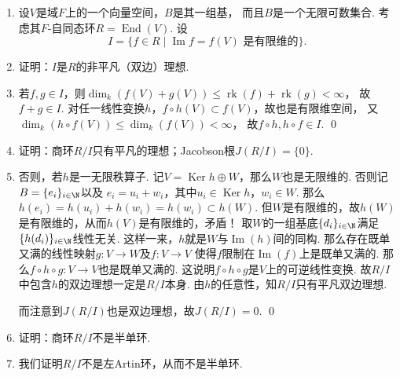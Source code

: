 \begin{enumerate}
        \item[8.5] 设$V$是域$F$上的一个向量空间，$B$是其一组基，
        而且$B$是一个无限可数集合. 考虑其$F$-自同态环$R = \operatorname{End}(V)$.
        设
        \[I = \{f \in R \mid \operatorname{Im} f = f(V)\text{ 是有限维的}\}.\]
        \item[(i)] 证明：$I$是$R$的非平凡（双边）理想.
        \item[\textbf{证明:}]
            若$f,g \in I$，则$\dim_{k}(f(V) + g(V)) 
            \leq \operatorname{rk}(f) + \operatorname{rk}(g) < \infty$，
            故$f+g \in I$.
            对任一线性变换$h$，$f \circ h(V) \subset f(V)$，故也是有限维空间，
            又$\dim_{k}(h \circ f(V)) \leq \dim_{k}(f(V)) < \infty$，
            故$f\circ h,h\circ f\in I$. \qed
        \item[(ii)] 证明：商环$R/I$只有平凡的理想；Jacobson根$J(R/I) = \{0\}$.
        \item[\textbf{证明:}]
            否则，若$h$是一无限秩算子.
            记$V = \operatorname{Ker} h \oplus W$，那么$W$也是无限维的.
            否则记$B = \{e_{i}\}_{i \in \N}$以及
            $e_{i} = u_{i} + w_{i}$，其中$u_{i} \in \operatorname{Ker} h$，$w_{i} \in W$.
            那么$h(e_{i}) = h(u_{i}) + h(w_{i}) = h(w_{i}) \subset h(W)$.
            但$W$是有限维的，故$h(W)$是有限维的，从而$h(V)$是有限维的，矛盾！            
            取$W$的一组基底$\{d_{i}\}_{i \in \N}$满足$\{h(d_{i})\}_{i \in \N}$线性无关. 
            这样一来，$h$就是$W$与$\operatorname{Im}(h)$间的同构.
            那么存在既单又满的线性映射$g:V \rightarrow W$及$f:V \rightarrow V$
            使得$f$限制在$\operatorname{Im}(f)$上是既单又满的.
            那么$f \circ h \circ g:V \rightarrow V$也是既单又满的.
            这说明$f \circ h \circ g$是$V$上的可逆线性变换.
            故$R/I$中包含$h$的双边理想一定是$R/I$本身. 
            由$h$的任意性，知$R/I$只有平凡双边理想.
            
            而注意到$J(R/I)$也是双边理想，故$J(R/I) = 0$.  \qed
        \item[(iii)] 证明：商环$R/I$不是半单环.
        \item[\textbf{证明:}]
            我们证明$R/I$不是左Artin环，从而不是半单环.
            

\end{enumerate}
